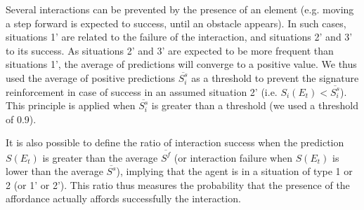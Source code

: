 \documentclass[conference]{IEEEtran}
\begin{document}

Several interactions can be prevented by the presence of an element (e.g. moving a step forward is expected to success, until an obstacle appears). In such cases, situations 1' are related to the failure of the interaction, and situations 2' and 3' to its success. As situations 2' and 3' are expected to be more frequent than situations 1', the average of predictions will converge to a positive value. We thus used the average of positive predictions $\overline{S_i^s}$ as a threshold to prevent the signature reinforcement in case of success in an assumed situation 2' (i.e. $S_i(E_t)<\overline{S_i^s}$). This principle is applied when $\overline{S_i^s}$ is greater than a threshold (we used a threshold of 0.9).



It is also possible to define the ratio of interaction success when the prediction $S(E_t)$ is greater than the average $\overline{S^f}$ (or interaction failure when $S(E_t)$ is lower than the average $\overline{S^s}$), implying that the agent is in a situation of type 1 or 2 (or 1' or 2'). This ratio thus measures the probability that the presence of the affordance actually affords successfully the interaction.




\end{document}

